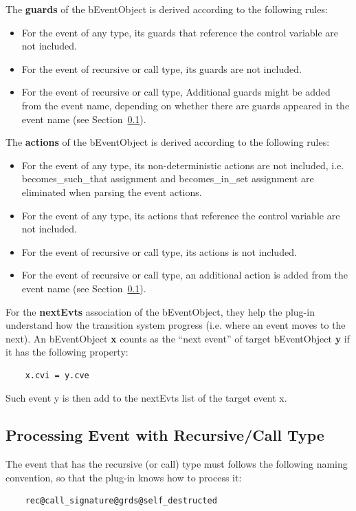 \documentclass{easychair}
\begin{document}
The \textbf{guards} of the bEventObject is derived according to the following rules:
\begin{itemize}
	\item For the event of any type, its guards that reference the control variable are not included.
	\item For the event of recursive or call type, its guards are not included.
	\item For the event of recursive or call type, Additional guards might be added from the event name, depending on whether there are guards appeared in the event name (see Section~\ref{subsec:issue}).  
\end{itemize}

The \textbf{actions} of the bEventObject is derived according to the following rules:
\begin{itemize}
	\item For the event of any type, its non-deterministic actions are not included, i.e. becomes\_such\_that assignment  and becomes\_in\_set assignment are eliminated when parsing the event actions.
	\item For the event of any type, its actions that reference the control variable are not included.
	\item For the event of recursive or call type, its actions is not included.
	\item For the event of recursive or call type, an additional action is added from the event name (see Section~\ref{subsec:issue}).  
\end{itemize}

For the \textbf{nextEvts} association of the bEventObject, they help the plug-in understand how the transition system progress (i.e. where an event moves to the next). An bEventObject \textbf{x} counts as the “next event” of target bEventObject \textbf{y} if it has the following property:
\begin{lstlisting}
	x.cvi = y.cve
\end{lstlisting}
Such event y is then add to the nextEvts list of the target event x.


\subsection{Processing Event with Recursive/Call Type}\label{subsec:issue}
The event that has the recursive (or call) type must follows the following naming convention, so that the plug-in knows how to process it:

\lstset{language=[68]Algol}
\begin{lstlisting}
	rec@call_signature@grds@self_destructed
\end{lstlisting}
\end{document}
